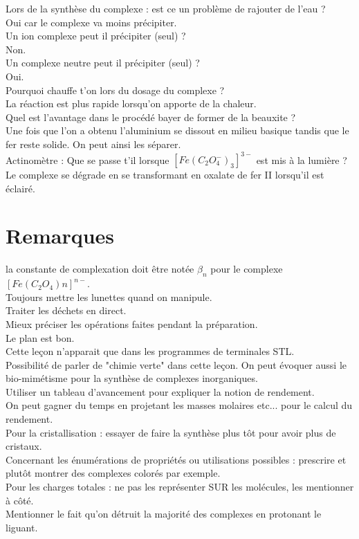 \documentclass[12pt,prb,aps,epsf]{article}
\begin{document}
Lors de la synthèse du complexe : est ce un problème de rajouter de l'eau ?\\
Oui car le complexe va moins précipiter.\\

Un ion complexe peut il précipiter (seul) ?\\
Non.\\

Un complexe neutre peut il précipiter (seul) ?\\
Oui.\\

Pourquoi chauffe t'on lors du dosage du complexe ?\\
La réaction est plus rapide lorsqu'on apporte de la chaleur.\\

Quel est l'avantage dans le procédé bayer de former de la beauxite ?\\
Une fois que l'on a obtenu l'aluminium se dissout en milieu basique tandis que le fer reste solide. On peut ainsi les séparer.\\

Actinomètre : Que se passe t'il lorsque $[Fe(C_2O_4^-)_3]^{3-}$ est mis à la lumière ?\\
Le complexe se dégrade en se transformant en oxalate de fer II lorsqu'il est éclairé.

\section*{Remarques}
la constante de complexation doit être notée $\beta_n$ pour le complexe $[Fe(C_2O_4)n]^{n-}$.\\
Toujours mettre les lunettes quand on manipule.\\
Traiter les déchets en direct.\\
Mieux préciser les opérations faites pendant la préparation.\\
Le plan est bon.\\ Cette leçon n'apparait que dans les programmes de terminales STL.\\
Possibilité de parler de "chimie verte" dans cette leçon. On peut évoquer aussi le bio-mimétisme pour la synthèse de complexes inorganiques.\\
Utiliser un tableau d'avancement pour expliquer la notion de rendement.\\ 
On peut gagner du temps en projetant les masses molaires etc... pour le calcul du rendement.\\
Pour la cristallisation : essayer de faire la synthèse plus tôt pour avoir plus de cristaux.\\
Concernant les énumérations de propriétés ou utilisations possibles : prescrire et plutôt montrer des complexes colorés par exemple.\\
Pour les charges totales : ne pas les représenter SUR les molécules, les mentionner à côté.\\
Mentionner le fait qu'on détruit la majorité des complexes en protonant le liguant.
 	
\end{document}

